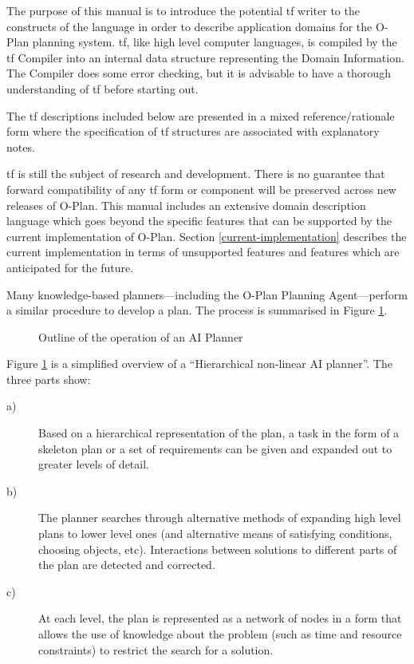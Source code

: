 The purpose of this manual is to introduce the potential {\sc tf} writer to
the constructs of the language in order to describe application domains for
the O-Plan planning system.  {\sc tf}, like high level computer languages, is
compiled by the {\sc tf} Compiler into an internal data structure representing
the Domain Information.  The Compiler does some error checking, but it is
advisable to have a thorough understanding of {\sc tf} before starting out.

The {\sc tf} descriptions included below are presented in a mixed
reference/rationale form where the specification of {\sc tf} structures are
associated with explanatory notes.

{\sc tf} is still the subject of research and development.  There is no
guarantee that forward compatibility of any {\sc tf} form or component will be
preserved across new releases of O-Plan.  This manual includes an extensive
domain description language which goes beyond the specific features that
can be supported by the current implementation of O-Plan.  Section
\ref{current-implementation} describes the current implementation in terms of
unsupported features and features which are anticipated for the future.


Many knowledge-based planners---including the O-Plan Planning Agent---perform
a similar procedure to develop a plan.  The process is summarised in Figure
\ref{f-plan-hier}.

\begin{figure}[htb]
\vspace{9cm}
\caption{Outline of the operation of an AI Planner}
\label{f-plan-hier}
\end{figure}

Figure \ref{f-plan-hier} is a simplified overview of a ``Hierarchical
non-linear AI planner''.  The three parts show:

\begin{description}

\item[a)] Based on a hierarchical representation of the plan, a task in
the form of a skeleton plan or a set of requirements can be given and
expanded out to greater levels of detail. 

\item[b)] The planner searches through alternative methods of expanding
high level plans to lower level ones (and alternative means of
satisfying conditions, choosing objects, etc).  Interactions between
solutions to different parts of the plan are detected and corrected. 

\item[c)] At each level, the plan is represented as a network of nodes
in a form that allows the use of knowledge about the problem (such as
time and resource constraints) to restrict the search for a solution. 

\end{description}

